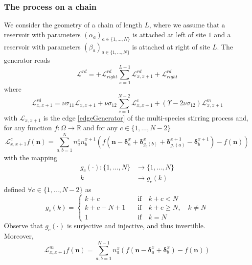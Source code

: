 \documentclass[10pt]{article}
\numberwithin{equation}{section}
\numberwithin{equation}{subsection}
\begin{document}
\subsubsection{The process on a chain}
We consider the geometry of a chain of length $L$, where we assume that a reservoir with parameters $(\alpha_{a})_{a\in\{1,\ldots,N\}}$ is attached at left of site $1$ and a reservoir with parameters $(\beta_{a})_{a\in\{1,\ldots,N\}}$ is attached at right of site $L$. The generator reads
\begin{equation}\label{RDGenerator}
	\mathcal{L}^{rd}=+\mathcal{L}_{right}^{rd}\sum_{x=1}^{L-1}\mathcal{L}_{x,x+1}^{rd}+\mathcal{L}_{right}^{rd}
\end{equation}
where
\begin{equation}\label{edgeGeneratorRD}
	\mathcal{L}_{x,x+1}^{rd}=\nu \sigma_{11}\mathcal{L}_{x,x+1}+\nu \sigma_{12}\sum_{c=1}^{N-2}\mathcal{L}_{x,x+1}^{c}+(\Upsilon-2\nu\sigma_{12})\mathcal{L}_{x,x+1}^{m}
\end{equation}
with $\mathcal{L}_{x,x+1}$ is the edge \eqref{edgeGenerator} of the multi-species stirring process and, for any function $f:\Omega\to \mathbb{R}$ and for any $c\in \{1,\ldots,N-2\}$
\begin{equation}
	\mathcal{L}_{x,x+1}^{c}f(\bm{n})=\sum_{a,b=1}^{N}n_{a}^{x}n_{b}^{x+1}\left(f(\bm{n}-\bm{\delta}_{a}^{x}+\bm{\delta}_{g_{c}(b)}^{x}+\bm{\delta}_{g_{c}(a)}^{x+1}-\bm{\delta}_{b}^{x+1})-f(\bm{n})\right)
\end{equation}
with the mapping 
\begin{equation}
	\begin{split}
		g_{c}(\cdot):\{1,\ldots,N\}&\to\{1,\ldots,N\}\\
		k&\to g_{c}(k)
	\end{split}
\end{equation}
defined $\forall c\in\{1,\ldots,N-2\}$ as 
\begin{equation}
	g_{c}(k)=\begin{cases}
		k+c \quad &\text{if}\quad k+c< N \\
		k+c-N+1\quad &\text{if}\quad k+c\geq N,\quad k\neq N\\
		1\quad &\text{if}\quad k=N
	\end{cases}
\end{equation}
Observe that $g_{c}(\cdot)$ is surjective and injective, and thus invertible. \\
Moreover,
\begin{equation}
	\mathcal{L}_{x,x+1}^{m}f(\bm{n})=\sum_{a,b=1}^{N-1}n_{a}^{x}\left(f(\bm{n}-\bm{\delta}_{a}^{x}+\bm{\delta}_{b}^{x})-f(\bm{n})\right)
\end{equation}
\end{document}
